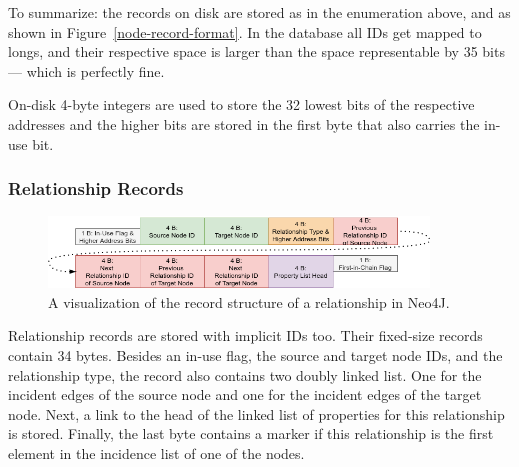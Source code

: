         To summarize: the records on disk are stored as in the enumeration above, and as shown in Figure~\ref{node-record-format}. 
        In the database all IDs get mapped to longs, and their respective space is larger than the space representable by 35 bits --- which is perfectly fine.
        
        On-disk 4-byte integers are used to store the 32 lowest bits of the respective addresses and the higher bits are stored in the first byte that also carries the in-use bit.
    
    \subsubsection*{Relationship Records}\label{n4j-rel}
        \begin{figure}[htp]
            \begin{center}
                \includegraphics[keepaspectratio,height=0.9\textheight,width=0.9\textwidth]{img/04-databases/relationship_record.png}
            \end{center}
            \caption{A visualization of the record structure of a relationship in Neo4J.}
            \label{rel_record}
        \end{figure}
            
        Relationship records are stored with implicit IDs too. 
        Their fixed-size records contain 34 bytes.
        Besides an in-use flag, the source and target node IDs, and the relationship type, the record also contains two doubly linked list.
        One for the incident edges of the source node and one for the incident edges of the target node.
        Next, a link to the head of the linked list of properties for this relationship is stored.
        Finally, the last byte contains a marker if this relationship is the first element in the incidence list of one of the nodes.
        

